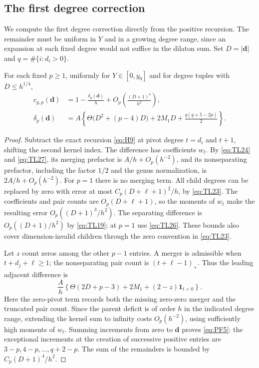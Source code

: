 \subsection{The first degree correction}

We compute the first degree correction directly from the positive
recursion. The remainder must be uniform in $Y$ and in a growing degree
range, since an expansion at each fixed degree would not suffice in the
dilaton sum. Set $D=|\mathbf d|$ and $q=\#\{i:d_i>0\}$.

\begin{lemma}\label{lem:first-degree}
For each fixed $p\ge1$, uniformly for $Y\in[0,y_0]$ and for degree tuples
with $D\le h^{1/4}$,
\begin{equation}
 \begin{aligned}
 c_{g,p}(\mathbf d)&=1-\frac{\delta_p(\mathbf d)}h
       +O_p\!\left(\frac{(D+1)^4}{h^2}\right),\\
 \delta_p(\mathbf d)&=A\left\{
 \Theta\bigl(D^2+(p-4)D\bigr)+2M_1D+
 \frac{q(q+5-2p)}2\right\}.
 \end{aligned}
 \label{eq:PF5}
\end{equation}
\end{lemma}

\begin{proof}
Subtract the exact recursion \eqref{eq:H9} at pivot degree $t=d_i$ and
$t+1$, shifting the second kernel index. The difference has coefficients
$w_\ell$. By \eqref{eq:TL24} and \eqref{eq:TL27}, its merging prefactor is
$A/h+O_p(h^{-2})$, and its nonseparating prefactor, including the factor
$1/2$ and the genus normalization, is $2A/h+O_p(h^{-2})$.
For $p=1$ there is no merging term. All child degrees can be replaced
by zero with error at most $C_p(D+\ell+1)^2/h$, by \eqref{eq:TL23}.
The coefficients and pair counts are $O_p(D+\ell+1)$, so the moments
of $w_\ell$ make the resulting error $O_p((D+1)^3/h^2)$.
The separating difference is $O_p((D+1)/h^2)$ by \eqref{eq:TL19};
at $p=1$ use \eqref{eq:TL26}. These bounds also cover dimension-invalid
children through the zero convention in \eqref{eq:TL23}.

Let $z$ count zeros among the other $p-1$ entries. A merger is admissible
when $t+d_j+\ell\ge1$; the nonseparating pair count is
$(t+\ell-1)_+$. Thus the leading adjacent difference is
\begin{equation}
 \frac Ah\left\{\Theta(2D+p-3)+2M_1+(2-z)\mathbf1_{t=0}\right\}.
 \label{eq:PF6}
\end{equation}
Here the zero-pivot term records both the missing zero-zero merger and
the truncated pair count. Since the parent deficit is of order $h$ in
the indicated degree range, extending the kernel sum to infinity costs
$O_p(h^{-2})$, using sufficiently high moments of $w_\ell$.
Summing increments from zero to $\mathbf d$ proves \eqref{eq:PF5}:
the exceptional increments at the creation of successive positive
entries are $3-p,4-p,\ldots,q+2-p$. The sum of the remainders is bounded
by $C_p(D+1)^4/h^2$.
\end{proof}

